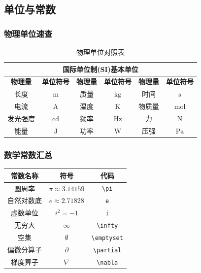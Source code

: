\documentclass{article}
\begin{document}
\subsection{单位与常数}

\subsubsection{物理单位速查}
\begin{table}[H]
\centering
\renewcommand{\arraystretch}{1.3}
\begin{tabular}{||c|c||c|c||c|c||}
\hline\hline
\multicolumn{6}{||c||}{\textbf{国际单位制(SI)基本单位}} \\
\hline\hline
\textbf{物理量} & \textbf{单位符号} & \textbf{物理量} & \textbf{单位符号} & \textbf{物理量} & \textbf{单位符号} \\
\hline
长度 & $\text{m}$ & 质量 & $\text{kg}$ & 时间 & $\text{s}$ \\
\hline
电流 & $\text{A}$ & 温度 & $\text{K}$ & 物质量 & $\text{mol}$ \\
\hline
发光强度 & $\text{cd}$ & 频率 & $\text{Hz}$ & 力 & $\text{N}$ \\
\hline
能量 & $\text{J}$ & 功率 & $\text{W}$ & 压强 & $\text{Pa}$ \\
\hline\hline
\end{tabular}
\caption{物理单位对照表}
\end{table}

\subsubsection{数学常数汇总}
\begin{center}
\large
\begin{tabular}{@{}ccc@{}}
\toprule
\textbf{常数名称} & \textbf{符号} & \textbf{代码} \\
\midrule
圆周率 & $\pi \approx 3.14159$ & \verb|\pi| \\
自然对数底 & $e \approx 2.71828$ & \verb|e| \\
虚数单位 & $i^2 = -1$ & \verb|i| \\
无穷大 & $\infty$ & \verb|\infty| \\
空集 & $\emptyset$ & \verb|\emptyset| \\
偏微分算子 & $\partial$ & \verb|\partial| \\
梯度算子 & $\nabla$ & \verb|\nabla| \\
\bottomrule
\end{tabular}
\end{center}
\end{document}
